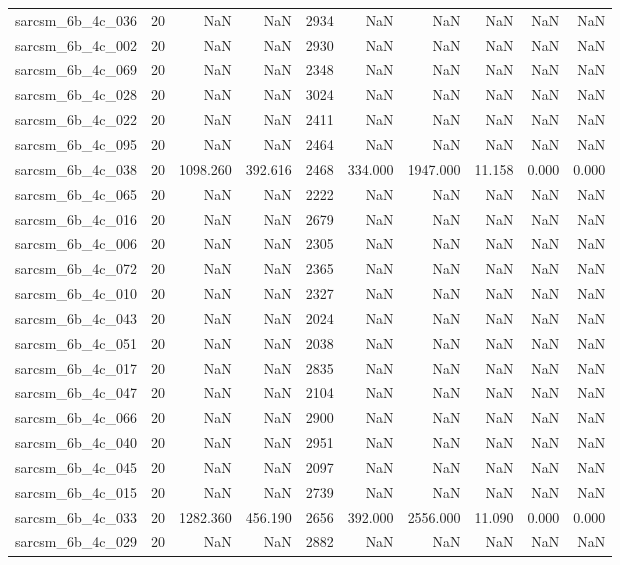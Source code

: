 \begin{tabular}{lrrrrrrrrr}
sarcsm\_6b\_4c\_036 & 20 & NaN & NaN & 2934 & NaN & NaN & NaN & NaN & NaN \\
sarcsm\_6b\_4c\_002 & 20 & NaN & NaN & 2930 & NaN & NaN & NaN & NaN & NaN \\
sarcsm\_6b\_4c\_069 & 20 & NaN & NaN & 2348 & NaN & NaN & NaN & NaN & NaN \\
sarcsm\_6b\_4c\_028 & 20 & NaN & NaN & 3024 & NaN & NaN & NaN & NaN & NaN \\
sarcsm\_6b\_4c\_022 & 20 & NaN & NaN & 2411 & NaN & NaN & NaN & NaN & NaN \\
sarcsm\_6b\_4c\_095 & 20 & NaN & NaN & 2464 & NaN & NaN & NaN & NaN & NaN \\
sarcsm\_6b\_4c\_038 & 20 & 1098.260 & 392.616 & 2468 & 334.000 & 1947.000 & 11.158 & 0.000 & 0.000 \\
sarcsm\_6b\_4c\_065 & 20 & NaN & NaN & 2222 & NaN & NaN & NaN & NaN & NaN \\
sarcsm\_6b\_4c\_016 & 20 & NaN & NaN & 2679 & NaN & NaN & NaN & NaN & NaN \\
sarcsm\_6b\_4c\_006 & 20 & NaN & NaN & 2305 & NaN & NaN & NaN & NaN & NaN \\
sarcsm\_6b\_4c\_072 & 20 & NaN & NaN & 2365 & NaN & NaN & NaN & NaN & NaN \\
sarcsm\_6b\_4c\_010 & 20 & NaN & NaN & 2327 & NaN & NaN & NaN & NaN & NaN \\
sarcsm\_6b\_4c\_043 & 20 & NaN & NaN & 2024 & NaN & NaN & NaN & NaN & NaN \\
sarcsm\_6b\_4c\_051 & 20 & NaN & NaN & 2038 & NaN & NaN & NaN & NaN & NaN \\
sarcsm\_6b\_4c\_017 & 20 & NaN & NaN & 2835 & NaN & NaN & NaN & NaN & NaN \\
sarcsm\_6b\_4c\_047 & 20 & NaN & NaN & 2104 & NaN & NaN & NaN & NaN & NaN \\
sarcsm\_6b\_4c\_066 & 20 & NaN & NaN & 2900 & NaN & NaN & NaN & NaN & NaN \\
sarcsm\_6b\_4c\_040 & 20 & NaN & NaN & 2951 & NaN & NaN & NaN & NaN & NaN \\
sarcsm\_6b\_4c\_045 & 20 & NaN & NaN & 2097 & NaN & NaN & NaN & NaN & NaN \\
sarcsm\_6b\_4c\_015 & 20 & NaN & NaN & 2739 & NaN & NaN & NaN & NaN & NaN \\
sarcsm\_6b\_4c\_033 & 20 & 1282.360 & 456.190 & 2656 & 392.000 & 2556.000 & 11.090 & 0.000 & 0.000 \\
sarcsm\_6b\_4c\_029 & 20 & NaN & NaN & 2882 & NaN & NaN & NaN & NaN & NaN \\

\end{tabular}
